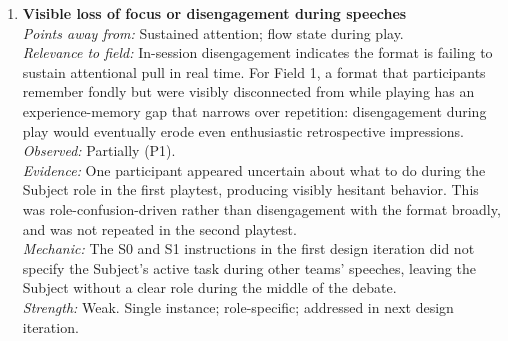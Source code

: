 \begin{enumerate}
\item \textbf{Visible loss of focus or disengagement during speeches}\\
\textit{Points away from:} Sustained attention; flow state during play.\\
\textit{Relevance to field:} In-session disengagement indicates the format is failing to sustain attentional pull in real time. For Field 1, a format that participants remember fondly but were visibly disconnected from while playing has an experience-memory gap that narrows over repetition: disengagement during play would eventually erode even enthusiastic retrospective impressions.\\
\textit{Observed:} Partially (P1).\\
\textit{Evidence:} One participant appeared uncertain about what to do during the Subject role in the first playtest, producing visibly hesitant behavior. This was role-confusion-driven rather than disengagement with the format broadly, and was not repeated in the second playtest.\\
\textit{Mechanic:} The S0 and S1 instructions in the first design iteration did not specify the Subject's active task during other teams' speeches, leaving the Subject without a clear role during the middle of the debate.\\
\textit{Strength:} Weak. Single instance; role-specific; addressed in next design iteration.


\end{enumerate}
